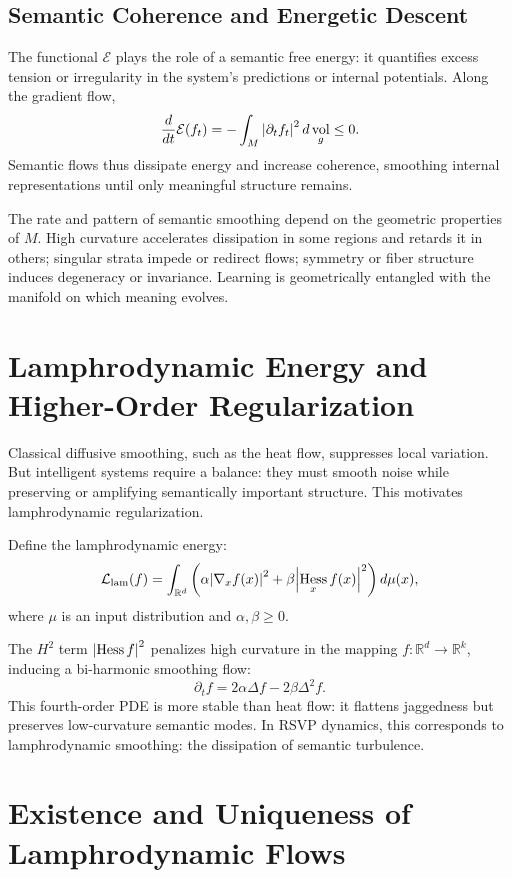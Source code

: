 \documentclass[12pt]{article}
\theoremstyle{plain}
\theoremstyle{definition}
\theoremstyle{remark}
\DeclareMathOperator{\vol}{vol}
\DeclareMathOperator{\Hess}{Hess}
\newcommand{\LamEnergy}{\mathcal{L}_{\mathrm{lam}}}
\begin{document}
\subsection{Semantic Coherence and Energetic Descent}

The functional $\mathcal{E}$ plays the role of a semantic free energy: it 
quantifies excess tension or irregularity in the system’s predictions or 
internal potentials. Along the gradient flow,
\[
\frac{d}{dt} \mathcal{E}(f_t)
= - \int_M \abs{\partial_t f_t}^2\, d\vol_g \le 0.
\]
Semantic flows thus dissipate energy and increase coherence, smoothing internal
representations until only meaningful structure remains.

The rate and pattern of semantic smoothing depend on the geometric properties 
of $M$. High curvature accelerates dissipation in some regions and retards it 
in others; singular strata impede or redirect flows; symmetry or fiber structure
induces degeneracy or invariance. Learning is geometrically entangled with 
the manifold on which meaning evolves.

\section{Lamphrodynamic Energy and Higher-Order Regularization}

Classical diffusive smoothing, such as the heat flow, suppresses local variation.
But intelligent systems require a balance: they must smooth noise while preserving 
or amplifying semantically important structure. This motivates lamphrodynamic
regularization.

Define the lamphrodynamic energy:
\[
\LamEnergy(f)
= \int_{\mathbb{R}^d} \left( 
      \alpha \abs{\nabla_x f(x)}^2
    + \beta \abs{\Hess_x f(x)}^2
  \right) d\mu(x),
\]
where $\mu$ is an input distribution and $\alpha, \beta \ge 0$.

The $H^2$ term $\abs{\Hess f}^2$ penalizes high curvature in the mapping 
$f : \mathbb{R}^d \to \mathbb{R}^k$, inducing a bi-harmonic smoothing flow:
\[
\partial_t f
= 2\alpha \Delta f - 2\beta \Delta^2 f.
\]
This fourth-order PDE is more stable than heat flow: it flattens jaggedness
but preserves low-curvature semantic modes. In RSVP dynamics, this corresponds
to lamphrodynamic smoothing: the dissipation of semantic turbulence.

\section{Existence and Uniqueness of Lamphrodynamic Flows}
\end{document}
